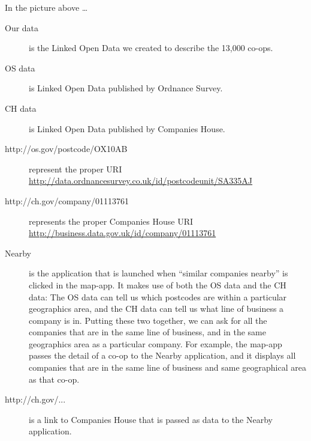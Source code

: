 In the picture above \dots
    \begin{description}
      \item[Our data]is the Linked Open Data we created to describe the 13,000 co-ops.
      \item[OS data] is Linked Open Data published by Ordnance Survey.
      \item[CH data] is Linked Open Data published by Companies House.
      \item[http://os.gov/postcode/OX10AB] \geek represent the proper URI \url{http://data.ordnancesurvey.co.uk/id/postcodeunit/SA335AJ}
      \item[http://ch.gov/company/01113761] \geek represents the proper Companies House URI \url{http://business.data.gov.uk/id/company/01113761}
      \item[Nearby] is the application that is launched when ``similar companies nearby'' is clicked in the map-app. 
	It makes use of both the OS data and the CH data:
	The OS data can tell us which postcodes are within a particular geographics area, and the CH data can tell us what line of business a company is in.
	Putting these two together, we can ask for all the companies that are in the same line of business, and in the same geographics area as a particular company.
	For example, the map-app passes the detail of a co-op to the Nearby application, and it displays all companies that are in the same line of business and same geographical area as that co-op.
      \item[http://ch.gov/...] \geek is a link to Companies House that is passed as data to the Nearby application.
    \end{description}

